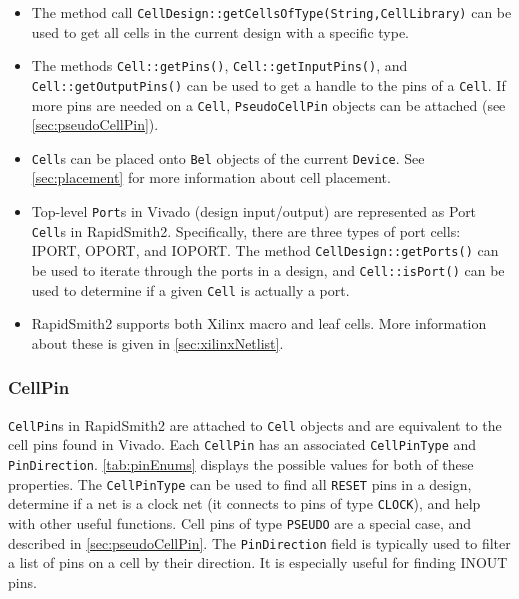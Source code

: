 \begin {itemize}
  \item The method call \texttt{CellDesign::getCellsOfType(String,CellLibrary)}
  can be used to get all cells in the current design with a specific type.
  
  \item The methods \texttt{Cell::getPins()},
  \texttt{Cell::getInputPins()}, and \texttt{Cell::getOutputPins()} can be used
  to get a handle to the pins of a \texttt{Cell}. If more pins are
  needed on a \texttt{Cell}, \texttt{PseudoCellPin} objects can be attached (see
  \autoref{sec:pseudoCellPin}). 
  
  \item \texttt{Cell}s can be placed onto \texttt{Bel} objects of the
  current \texttt{Device}. See \autoref{sec:placement} for more information about
  cell placement.
  
  \item Top-level \texttt{Port}s in Vivado (design input/output) are represented as
  Port \texttt{Cell}s in RapidSmith2. Specifically, there are three types of
  port cells: IPORT, OPORT, and IOPORT. The method \texttt{CellDesign::getPorts()} can
  be used to iterate through the ports in a design, and 
  \texttt{Cell::isPort()} can be used to determine if a given \texttt{Cell} is
  actually a port.
  
  \item RapidSmith2 supports both Xilinx macro and leaf cells. More information
  about these is given in \autoref{sec:xilinxNetlist}.
\end{itemize}

\subsubsection{CellPin} \label{sec:cellPin}

\texttt{CellPin}s in RapidSmith2 are attached to \texttt{Cell} objects
and are equivalent to the cell pins found in Vivado. Each \texttt{CellPin}
has an associated \texttt{CellPinType} and \texttt{PinDirection}.
\autoref{tab:pinEnums} displays the possible values for both of these
properties. The \texttt{CellPinType} can be used to find all \texttt{RESET}
pins in a design, determine if a net is a clock net (it connects to pins of type
\texttt{CLOCK}), and help with other useful functions. Cell pins of type
\texttt{PSEUDO} are a special case, and described in \autoref{sec:pseudoCellPin}.
The \texttt{PinDirection} field is typically used to filter a list of
pins on a cell by their direction. It is especially useful for finding INOUT
pins.

